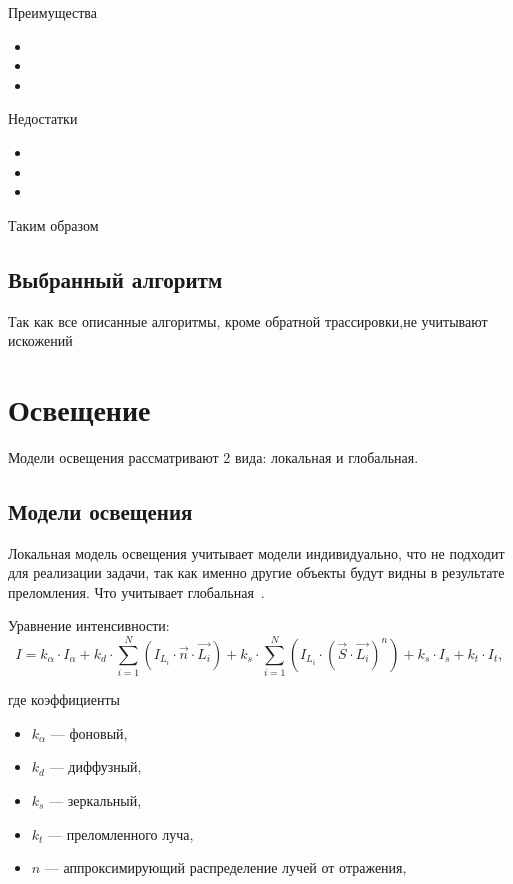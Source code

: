 Преимущества

\begin{itemize}
	\item 
	\item 
	\item
\end{itemize}

Недостатки

\begin{itemize}
	\item 
	\item 
	\item
\end{itemize}

Таким образом

\subsection{Выбранный алгоритм}

Так как все описанные алгоритмы, кроме обратной трассировки,не учитывают искожений

\section{Освещение}

Модели освещения рассматривают 2 вида: локальная и глобальная.

\subsection{Модели освещения}

Локальная модель освещения учитывает модели индивидуально, что не подходит для реализации задачи, так как именно другие объекты будут видны в результате преломления. Что учитывает глобальная~\cite[с.~464,~с.~502,~с.~548]{rogers-book}.

Уравнение интенсивности:
\begin{equation}
	I = k_{\alpha} \cdot I_{\alpha} + k_d \cdot \sum_{i=1}^{N} (I_{L_i} \cdot \vec{n} \cdot \vec{L_i}) + k_s \cdot \sum_{i=1}^{N} (I_{L_i} \cdot (\vec{S} \cdot \vec{L_i}) ^ n) + k_s \cdot I_s + k_t \cdot I_t,
\end{equation}

где коэффициенты
\begin{itemize}
	\item $k_{\alpha}$ --- фоновый,
	\item $k_d$ --- диффузный,
	\item $k_s$ --- зеркальный,
	\item $k_t$ --- преломленного луча,
	\item $n$ --- аппроксимирующий распределение лучей от отражения,
\end{itemize}

